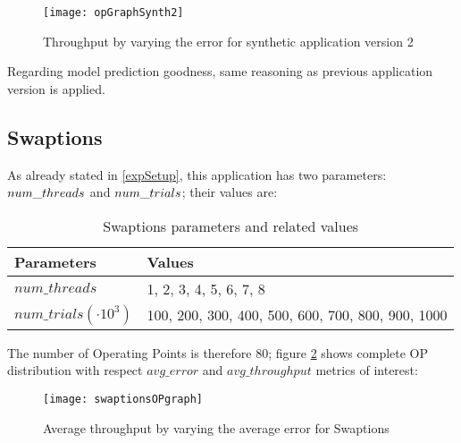 \begin{figure}[h]

    \centering
    \texttt{[image: opGraphSynth2]}
    \caption{Throughput by varying the error for synthetic application version 2}
    \label{fig::opListSynth2}
    
\end{figure}

Regarding model prediction goodness, same reasoning as previous application version is applied.


\subsection{Swaptions}

As already stated in \ref{expSetup}, this application has two parameters: $num\_\-threads$ and $num\_\-trials$; their values are:

\begin{table}[h]

    \centering

    \begin{tabular}{ll}
    
        \toprule
        Parameters & Values \\
        \midrule
        $num\_threads$ & 1, 2, 3, 4, 5, 6, 7, 8 \\
        $num\_trials (\cdot 10^3)$ & 100, 200, 300, 400, 500, 600, 700, 800, 900, 1000 \\
        \bottomrule 
    
    \end{tabular}

    \caption{Swaptions parameters and related values}

\end{table}

The number of Operating Points is therefore 80; figure \ref{fig::swaptionsOPs} shows complete OP distribution with respect $avg\_error$ and $avg\_throughput$ metrics of interest:

\begin{figure}[h]

    \centering
    \texttt{[image: swaptionsOPgraph]}
    \caption{Average throughput by varying the average error for Swaptions}
    \label{fig::swaptionsOPs}
    
\end{figure}






